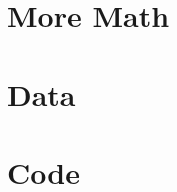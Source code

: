 \documentclass[12pt,twosided]{report}
\begin{document}
\begin{appendices}


  
\chapter{More Math}
\label{appendix:math}


\chapter{Data}
\label{appendix:data}


\chapter{Code}
\label{appendix:code}

\end{appendices}

\printbibliography[heading=bibintoc,title={References}]
\end{document}
